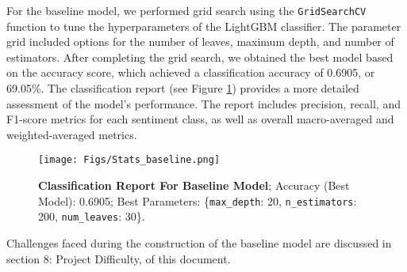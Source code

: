 For the baseline model, we performed grid search using the \texttt{GridSearchCV} function to tune the hyperparameters of the LightGBM classifier. The parameter grid included options for the number of leaves, maximum depth, and number of estimators.
After completing the grid search, we obtained the best model based on the accuracy score, which achieved a classification accuracy of 0.6905, or 69.05\%.
The classification report (see Figure \ref{fig:classreport}) provides a more detailed assessment of the model's performance. The report includes precision, recall, and F1-score metrics for each sentiment class, as well as overall macro-averaged and weighted-averaged metrics.

\begin{figure}[!ht]
    \centering
    \texttt{[image: Figs/Stats\_baseline.png]}
    \caption{\textbf{Classification Report For Baseline Model}; Accuracy (Best Model): 0.6905; Best Parameters: \{\texttt{max\_depth}: 20, \texttt{n\_estimators}: 200, \texttt{num\_leaves}: 30\}.}
    \label{fig:classreport}
\end{figure}

Challenges faced during the construction of the baseline model are discussed in section 8: Project Difficulty, of this document.

